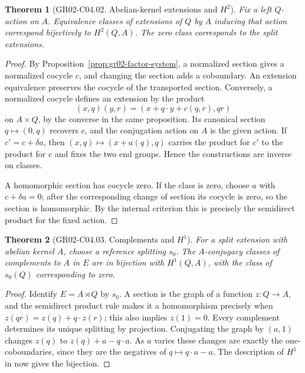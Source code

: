 \documentclass[11pt,oneside,openany]{book}
\newtheorem{theorem}{Theorem}[chapter]
\theoremstyle{definition}
\theoremstyle{remark}
\begin{document}
\begin{theorem}[GR02-C04.02. Abelian-kernel extensions and \(H^2\)]
\label{thm:gr02-h2-extensions}
Fix a left \(Q\)-action on \(A\). Equivalence classes of extensions
of \(Q\) by \(A\) inducing that action correspond bijectively to
\(H^2(Q,A)\). The zero class corresponds to the split extensions.
\end{theorem}

\begin{proof}
By Proposition~\ref{prop:gr02-factor-system}, a normalized
section gives a normalized cocycle \(c\), and changing the section
adds a coboundary. An extension equivalence preserves the cocycle
of the transported section. Conversely, a normalized cocycle
defines an extension by the product
\[
 (x,q)(y,r)=(x+q\cdot y+c(q,r),qr)
\]
on \(A\times Q\), by the converse in the same proposition.
Its canonical section \(q\mapsto(0,q)\) recovers \(c\), and the
conjugation action on \(A\) is the given action. If
\(c'=c+\delta a\), then \((x,q)\mapsto(x+a(q),q)\) carries the
product for \(c'\) to the product for \(c\) and fixes the two
end groups. Hence the constructions are inverse on classes.

A homomorphic section has cocycle zero. If the class is zero,
choose \(a\) with \(c+\delta a=0\); after the corresponding change
of section its cocycle is zero, so the section is homomorphic.
By the internal criterion this is precisely the semidirect product
for the fixed action.
\end{proof}

\begin{theorem}[GR02-C04.03. Complements and \(H^1\)]
\label{thm:gr02-h1-complements}
For a split extension with abelian kernel \(A\), choose a reference
splitting \(s_0\). The \(A\)-conjugacy classes of complements to
\(A\) in \(E\) are in bijection with \(H^1(Q,A)\), with the class
of \(s_0(Q)\) corresponding to zero.
\end{theorem}

\begin{proof}
Identify \(E=A\rtimes Q\) by \(s_0\). A section is the graph
of a function \(z:Q\to A\), and the semidirect product rule
makes it a homomorphism precisely when
\(z(qr)=z(q)+q\cdot z(r)\); this also implies \(z(1)=0\).
Every complement determines its unique splitting by projection.
Conjugating the graph by \((a,1)\) changes \(z(q)\) to
\(z(q)+a-q\cdot a\). As \(a\) varies these changes are exactly
the one-coboundaries, since they are the negatives of
\(q\mapsto q\cdot a-a\). The description of \(H^1\) in
\cite[A03]{homalg} now gives the bijection.
\end{proof}
\end{document}
